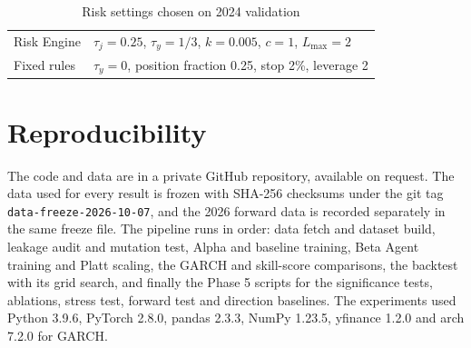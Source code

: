 \begin{table}[!h]
  \centering
  \caption{Risk settings chosen on 2024 validation}
  \label{tab:chosen}
  \footnotesize
  \begin{tabularx}{\columnwidth}{@{}lX@{}}
    \toprule
    Risk Engine & $\tau_j = 0.25$, $\tau_y = 1/3$, $k = 0.005$, $c = 1$, $L_{\max} = 2$ \\
    Fixed rules & $\tau_y = 0$, position fraction 0.25, stop 2\%, leverage 2 \\
    \bottomrule
  \end{tabularx}
\end{table}

\section{Reproducibility}

The code and data are in a private GitHub repository, available on request. The data used for every result is frozen with SHA-256 checksums under the git tag \texttt{data-freeze-2026-10-07}, and the 2026 forward data is recorded separately in the same freeze file. The pipeline runs in order: data fetch and dataset build, leakage audit and mutation test, Alpha and baseline training, Beta Agent training and Platt scaling, the GARCH and skill-score comparisons, the backtest with its grid search, and finally the Phase 5 scripts for the significance tests, ablations, stress test, forward test and direction baselines. The experiments used Python 3.9.6, PyTorch 2.8.0, pandas 2.3.3, NumPy 1.23.5, yfinance 1.2.0 and arch 7.2.0 for GARCH.

